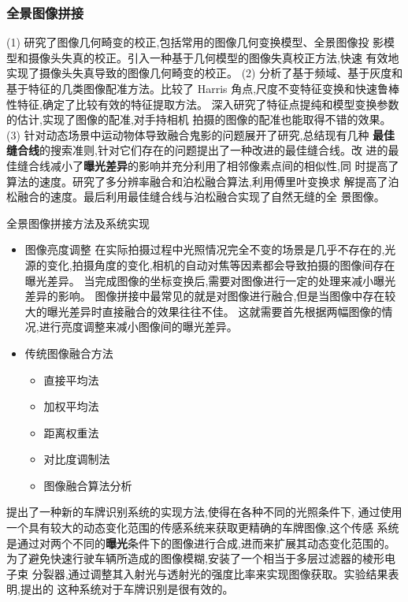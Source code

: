 \message{ !name(main.tex)}\documentclass{amsart}
\begin{document}
\subsubsection{全景图像拼接}
\label{sec:0204}
\cite{赵书睿}
(1) 研究了图像几何畸变的校正,包括常用的图像几何变换模型、全景图像投
影模型和摄像头失真的校正。引入一种基于几何模型的图像失真校正方法,快速
有效地实现了摄像头失真导致的图像几何畸变的校正。
(2) 分析了基于频域、基于灰度和基于特征的几类图像配准方法。比较了 Harris
角点,尺度不变特征变换和快速鲁棒性特征,确定了比较有效的特征提取方法。
深入研究了特征点提纯和模型变换参数的估计,实现了图像的配准,对手持相机
拍摄的图像的配准也能取得不错的效果。
(3) 针对动态场景中运动物体导致融合鬼影的问题展开了研究,总结现有几种
\textbf{最佳缝合线}的搜索准则,针对它们存在的问题提出了一种改进的最佳缝合线。改
进的最佳缝合线减小了\textbf{曝光差异}的影响并充分利用了相邻像素点间的相似性,同
时提高了算法的速度。研究了多分辨率融合和泊松融合算法,利用傅里叶变换求
解提高了泊松融合的速度。最后利用最佳缝合线与泊松融合实现了自然无缝的全
景图像。

全景图像拼接方法及系统实现
\begin{itemize}
\item 图像亮度调整
在实际拍摄过程中光照情况完全不变的场景是几乎不存在的,光源的变化,拍摄角度的变化,相机的自动对焦等因素都会导致拍摄的图像间存在曝光差异。
当完成图像的坐标变换后,需要对图像进行一定的处理来减小曝光差异的影响。
图像拼接中最常见的就是对图像进行融合,但是当图像中存在较大的曝光差异时直接融合的效果往往不佳。
这就需要首先根据两幅图像的情况,进行亮度调整来减小图像间的曝光差异。
\item 传统图像融合方法
  \begin{itemize}
  \item 直接平均法
  \item 加权平均法
  \item 距离权重法
  \item 对比度调制法
  \item 图像融合算法分析
  \end{itemize}
\end{itemize}

\cite{张芮}提出了一种新的车牌识别系统的实现方法,使得在各种不同的光照条件下,
通过使用一个具有较大的动态变化范围的传感系统来获取更精确的车牌图像,这个传感
系统是通过对两个不同的\textbf{曝光}条件下的图像进行合成,进而来扩展其动态变化范围的。
为了避免快速行驶车辆所造成的图像模糊,安装了一个相当于多层过滤器的棱形电子束
分裂器,通过调整其入射光与透射光的强度比率来实现图像获取。实验结果表明,提出的
这种系统对于车牌识别是很有效的。
\end{document}
